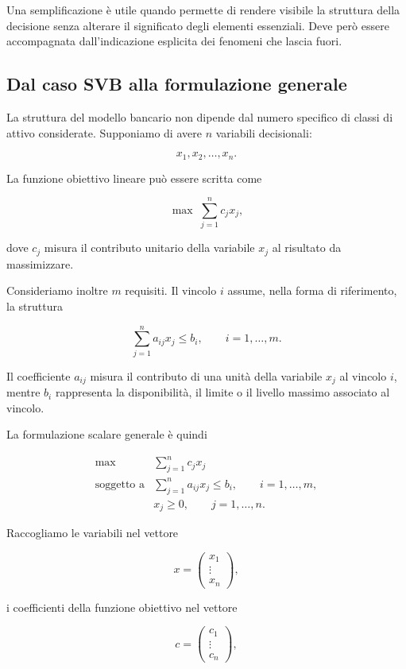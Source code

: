 Una semplificazione \`e utile quando permette di rendere visibile la struttura
della decisione senza alterare il significato degli elementi essenziali. Deve
per\`o essere accompagnata dall'indicazione esplicita dei fenomeni che lascia
fuori.

\subsection{Dal caso SVB alla formulazione generale}

La struttura del modello bancario non dipende dal numero specifico di classi
di attivo considerate. Supponiamo di avere $n$ variabili decisionali:

\[
x_1,x_2,\ldots,x_n.
\]

La funzione obiettivo lineare pu\`o essere scritta come

\[
\max\;
\sum_{j=1}^{n}c_jx_j,
\]

\noindent dove $c_j$ misura il contributo unitario della variabile $x_j$ al risultato
da massimizzare.

Consideriamo inoltre $m$ requisiti. Il vincolo $i$ assume, nella forma di
riferimento, la struttura

\[
\sum_{j=1}^{n}a_{ij}x_j\leq b_i,
\qquad
i=1,\ldots,m.
\]

Il coefficiente $a_{ij}$ misura il contributo di una unit\`a della variabile
$x_j$ al vincolo $i$, mentre $b_i$ rappresenta la disponibilit\`a, il limite
o il livello massimo associato al vincolo.

La formulazione scalare generale \`e quindi

\[
\begin{array}{ll}
\max
&
\displaystyle\sum_{j=1}^{n}c_jx_j
\\[8pt]
\mbox{soggetto a}
&
\displaystyle\sum_{j=1}^{n}a_{ij}x_j\leq b_i,
\qquad i=1,\ldots,m,
\\[8pt]
&
x_j\geq0,
\qquad j=1,\ldots,n.
\end{array}
\]

Raccogliamo le variabili nel vettore

\[
x=
\begin{pmatrix}
x_1\\
\vdots\\
x_n
\end{pmatrix},
\]

\noindent i coefficienti della funzione obiettivo nel vettore

\[
c=
\begin{pmatrix}
c_1\\
\vdots\\
c_n
\end{pmatrix},
\]

